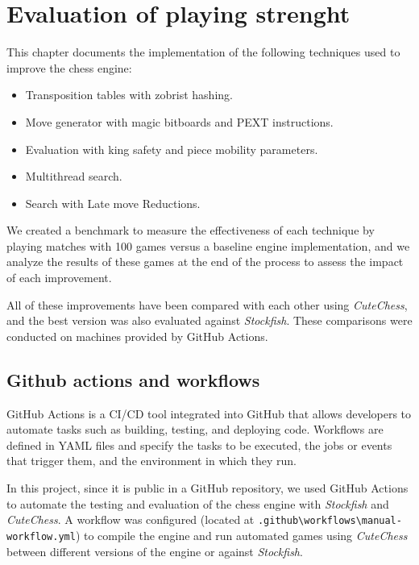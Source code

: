\chapter{Evaluation of playing strenght}\label{cap:analysis}

This chapter documents the implementation of the following techniques used to improve the chess engine:

\begin{itemize}[itemsep=1pt]
    \item Transposition tables with zobrist hashing.
    \item Move generator with magic bitboards and PEXT instructions.
    \item Evaluation with king safety and piece mobility parameters.
    \item Multithread search.
    \item Search with Late move Reductions.
\end{itemize}


\vspace{1em}

\noindent We created a benchmark to measure the effectiveness of each technique by playing matches with 100 games versus a baseline engine implementation, and we analyze the results of these games at the end of the process to assess the impact of each improvement.


All of these improvements have been compared with each other using \textit{CuteChess}, and the best version was also evaluated against \textit{Stockfish}. These comparisons were conducted on machines provided by GitHub Actions.

\section{Github actions and workflows}

GitHub Actions is a CI/CD tool integrated into GitHub that allows developers to automate tasks such as building, testing, and deploying code. Workflows are defined in YAML files and specify the tasks to be executed, the jobs or events that trigger them, and the environment in which they run.

\vspace{1em}

\noindent In this project, since it is public in a GitHub repository, we used GitHub Actions to automate the testing and evaluation of the chess engine with \textit{Stockfish} and \textit{CuteChess}. A workflow was configured (located at \texttt{.github\textbackslash{}workflows\textbackslash{}manual-workflow.yml}) to compile the engine and run automated games using \textit{CuteChess} between different versions of the engine or against \textit{Stockfish}.

